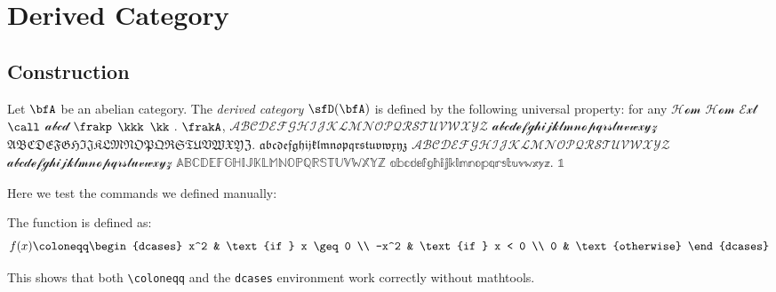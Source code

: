 \section{Derived Category}


\subsection{Construction}
    \begin{definition}\label{def:derived_category}
        Let \(\bfA\) be an abelian category. The \emph{derived category} \(\sfD(\bfA)\) is defined by the following universal property: 
        for any \(\mathcal{H\!o\!m}\) \(\mathcal{Hom}\) \(\mathcal{Ext}\) \(\call\) \(\mathscr{abcd}\) \(\frakp\) \(\kkk\) \(\kk\) .
        \(\frakA\), \(\mathscr{ABCDEFGHIJKLMNOPQRSTUVWXYZ}\) 
        \(\mathscr{abcdefghijklmnopqrstuvwxyz}\)
        \(\mathfrak{ABCDEFGHIJKLMNOPQRSTUVWXYZ}\).
        \(\mathfrak{abcdefghijklmnopqrstuvwxyz}\)
        \(\mathcal{ABCDEFGHIJKLMNOPQRSTUVWXYZ}\)
        \(\mathcal{abcdefghijklmnopqrstuvwxyz}\)
        \(\mathbb{ABCDEFGHIJKLMNOPQRSTUVWXYZ}\)
        \(\mathbb{abcdefghijklmnopqrstuvwxyz}\).
        \(\mathbb{1}\)
    \end{definition}

    \begin{example}
        Here we test the commands we defined manually:
        
        The function is defined as:
        \[f(x) \coloneqq \begin{dcases}
            x^2 & \text{if } x \geq 0 \\
            -x^2 & \text{if } x < 0 \\
            0 & \text{otherwise}
        \end{dcases}\]
        
        This shows that both \verb|\coloneqq| and the \verb|dcases| environment work correctly without mathtools.
    \end{example}